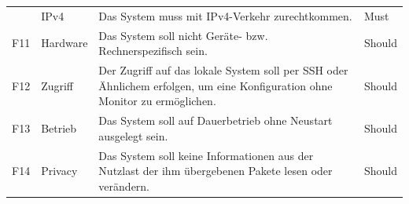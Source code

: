 \documentclass[../review_3.tex]{subfiles}
\begin{document}
\begin{longtable} [h] {p{1cm} p{4cm} p{7cm} l}
    & IPv4                                           & Das System muss mit IPv4-Verkehr zurechtkommen.                                                                                                                                                                                                         & Must            \\
    F11                                                                                                                                                                                                                                                                                            & Hardware                                       & Das System soll nicht Geräte- bzw. Rechnerspezifisch sein.                                                                                                                                                                                              & Should          \\
    F12                                                                                                                                                                                                              & Zugriff                                        & Der Zugriff auf das lokale System soll per SSH oder Ähnlichem erfolgen, um eine Konfiguration ohne Monitor zu ermöglichen.                                                                                                                              & Should          \\
    F13                                                                                                                                                                                                              & Betrieb                                        & Das System soll auf Dauerbetrieb ohne Neustart ausgelegt sein.                                                                                                                                                                                          & Should          \\
    F14                                                                                                                                                                                                              & Privacy                                        & Das System soll keine Informationen aus der Nutzlast der ihm übergebenen Pakete lesen oder verändern.                                                                                                                                                   & Should          \\

\end{longtable}
\end{document}
